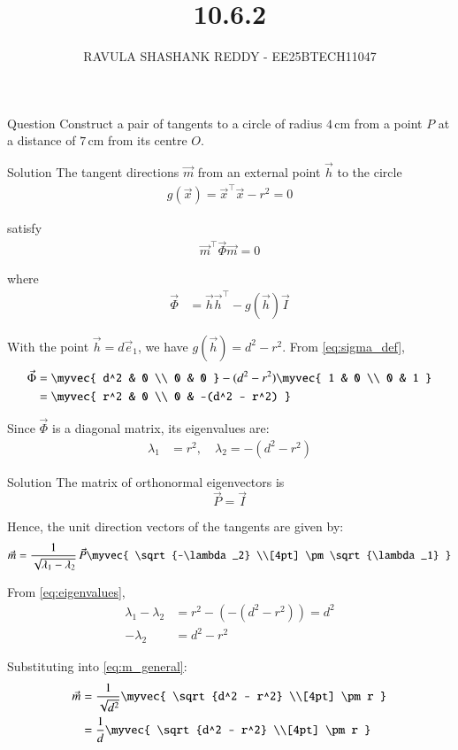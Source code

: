 \documentclass{beamer}
\title %
{10.6.2}
\author %
{RAVULA SHASHANK REDDY - EE25BTECH11047}
\begin{document}
	
	
	\frame{\titlepage}
	\begin{frame}{Question}
    Construct a pair of tangents to a circle of radius \(4\,\text{cm}\) from a point \(P\) at a distance of \(7\,\text{cm}\) from its centre \(O\).
\end{frame}
\begin{frame}{Solution}
 The tangent directions \(\vec{m}\) from an external point \(\vec{h}\) to the circle 
\begin{align}
g(\vec{x}) = \vec{x}^\top \vec{x} - r^2 = 0
\end{align}

satisfy 
\begin{align}
\vec{m}^\top \vec{\Phi} \vec{m} = 0
\end{align}

where 
\begin{align}
\vec{\Phi} &= \vec{h}\vec{h}^\top - g(\vec{h})\vec{I} \label{eq:sigma_def}
\end{align}

With the point \(\vec{h} = d\vec{e}_1\), we have \(g(\vec{h}) = d^2 - r^2\). From \eqref{eq:sigma_def},
\begin{align}
\vec{\Phi} &= 
\myvec{
d^2 & 0 \\
0 & 0
}
-
(d^2 - r^2)
\myvec{
1 & 0 \\
0 & 1
}
\\
&=
\myvec{
r^2 & 0 \\
0 & -(d^2 - r^2)
} \label{eq:sigma_matrix}
\end{align}

Since \(\vec{\Phi}\) is a diagonal matrix, its eigenvalues are:
\begin{align}
\lambda_1 &= r^2, \quad \lambda_2 = -(d^2 - r^2) \label{eq:eigenvalues}
\end{align}
\end{frame}
\begin{frame}{Solution}
The matrix of orthonormal eigenvectors is 
\[
\vec{P} = \vec{I}
\]

Hence, the unit direction vectors of the tangents are given by:
\begin{align}
\vec{m} = \frac{1}{\sqrt{\lambda_1 - \lambda_2}} \, \vec{P} 
\myvec{
\sqrt{-\lambda_2} \\[4pt]
\pm \sqrt{\lambda_1}
}
\label{eq:m_general}
\end{align}

From \eqref{eq:eigenvalues},
\begin{align}
\lambda_1 - \lambda_2 &= r^2 - (-(d^2 - r^2)) = d^2 \\
-\lambda_2 &= d^2 - r^2
\end{align}

Substituting into \eqref{eq:m_general}:
\begin{align}
\vec{m} 
&= \frac{1}{\sqrt{d^2}} 
\myvec{
\sqrt{d^2 - r^2} \\[4pt]
\pm r
}
\\
&= \frac{1}{d}
\myvec{
\sqrt{d^2 - r^2} \\[4pt]
\pm r
}
\label{eq:m_final}
\end{align}
\end{frame}
\end{document}
